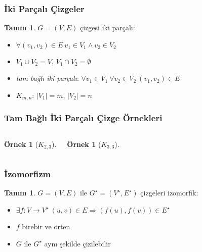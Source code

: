 \documentclass[dvipsnames]{beamer}
\theoremstyle{definition}
\newtheorem{tanim}[theorem]{Tanım}
\theoremstyle{example}
\newtheorem{ornek}[theorem]{Örnek}
\theoremstyle{plain}
\begin{document}
\begin{frame}
  \frametitle{İki Parçalı Çizgeler}

  \begin{tanim}
    $G=(V,E)$ çizgesi \alert{iki parçalı}:
    \begin{itemize}
      \item $\forall (v_1,v_2) \in E~v_1 \in V_1 \wedge v_2 \in V_2$
      \item $V_1 \cup V_2 = V$, $V_1 \cap V_2 = \emptyset$
    \end{itemize}
  \end{tanim}

  \pause
  \begin{itemize}
    \item \emph{tam bağlı iki parçalı}:
      $\forall v_1 \in V_1~\forall v_2 \in V_2~(v_1,v_2) \in E$
    \item $K_{m,n}$: $|V_1|=m$, $|V_2|=n$
  \end{itemize}
\end{frame}

\begin{frame}
  \frametitle{Tam Bağlı İki Parçalı Çizge Örnekleri}

  \begin{columns}[t]
    \begin{ornek}[$K_{2,3}$]
      \begin{center}
      \end{center}
    \end{ornek}

    \begin{ornek}[$K_{3,3}$]
      \begin{center}
      \end{center}
    \end{ornek}
  \end{columns}
\end{frame}

\begin{frame}
  \frametitle{İzomorfizm}

  \begin{tanim}
    $G=(V,E)$ ile $G^\star=(V^\star,E^\star)$ çizgeleri \alert{izomorfik}:
    \begin{itemize}
      \item $\exists f: V \rightarrow V^\star~(u,v) \in E \Rightarrow (f(u),f(v)) \in E^\star$
      \item $f$ birebir ve örten
    \end{itemize}
  \end{tanim}

  \pause
  \begin{itemize}
    \item $G$ ile $G^\star$ aynı şekilde çizilebilir
  \end{itemize}
\end{frame}
\end{document}
